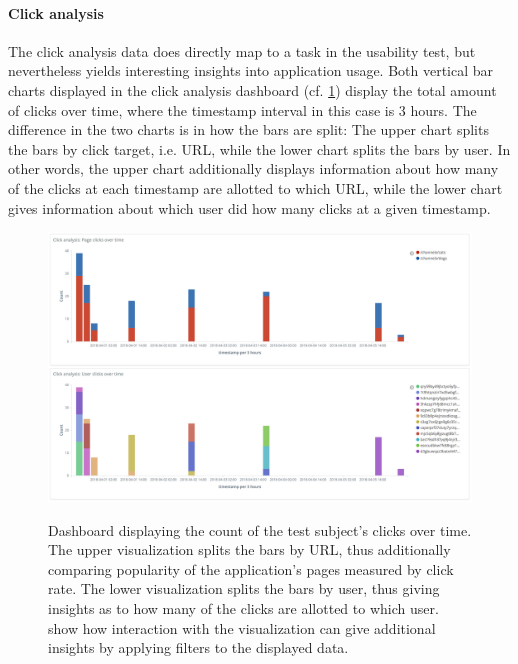 \paragraph{Click analysis}

The click analysis data does directly map to a task in the usability test, but nevertheless yields interesting insights into application usage.
Both vertical bar charts displayed in the click analysis dashboard (cf. \cref{figure:evaluation:user:dashboard-clicks}) display the total amount of clicks over time, where the timestamp interval in this case is 3 hours.
The difference in the two charts is in how the bars are split:
The upper chart splits the bars by click target, i.e. URL, while the lower chart splits the bars by user.
In other words, the upper chart additionally displays information about how many of the clicks at each timestamp are allotted to which URL, while the lower chart gives information about which user did how many clicks at a given timestamp.

\begin{figure}[h]
        \caption{
        Dashboard displaying the count of the test subject's clicks over time.
        The upper visualization splits the bars by URL, thus additionally comparing popularity of the application's pages measured by click rate.
        The lower visualization splits the bars by user, thus giving insights as to how many of the clicks are allotted to which user.
         show how interaction with the visualization can give additional insights by applying filters to the displayed data.
        }
        \includegraphics[width=1.1\textwidth]{gfx/dashboard-clicks.png}
        \label{figure:evaluation:user:dashboard-clicks}
\end{figure}

